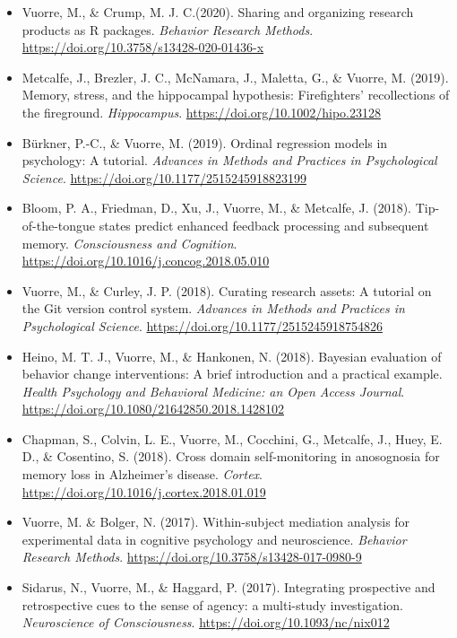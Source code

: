 \documentclass[12pt, a4paper]{article}
\newcommand{\years}[1]{\marginnote{\scriptsize #1}}
\begin{document}
\begin{itemize}
  \item \years{2020} Vuorre, M.\footnotemark[1], \& Crump, M. J. C.\footnotemark[1] (2020). Sharing and organizing research products as R packages. \emph{Behavior Research Methods}. \url{https://doi.org/10.3758/s13428-020-01436-x}
  \item \years{2019} Metcalfe, J., Brezler, J. C., McNamara, J., Maletta, G., \& Vuorre, M. (2019). Memory, stress, and the hippocampal hypothesis: Firefighters' recollections of the fireground. \emph{Hippocampus}. \url{https://doi.org/10.1002/hipo.23128}
  \item Bürkner, P.-C., \& Vuorre, M. (2019). Ordinal regression models in psychology: A tutorial. \emph{Advances in Methods and Practices in Psychological Science}. \url{https://doi.org/10.1177/2515245918823199}
  \item \years{2018} Bloom, P. A., Friedman, D., Xu, J., Vuorre, M., \& Metcalfe, J. (2018). Tip-of-the-tongue states predict enhanced feedback processing and subsequent memory. \emph{Consciousness and Cognition}. \url{https://doi.org/10.1016/j.concog.2018.05.010}
  \item Vuorre, M., \& Curley, J. P. (2018). Curating research assets: A tutorial on the Git version control system. \emph{Advances in Methods and Practices in Psychological Science}. \url{https://doi.org/10.1177/2515245918754826}
  \item Heino, M. T. J.\footnotemark[1], Vuorre, M.\footnotemark[1], \& Hankonen, N. (2018). Bayesian evaluation of behavior change interventions: A brief introduction and a practical example. \emph{Health Psychology and Behavioral Medicine: an Open Access Journal}. \url{https://doi.org/10.1080/21642850.2018.1428102}
  \item Chapman, S., Colvin, L. E., Vuorre, M., Cocchini, G., Metcalfe, J., Huey, E. D., \& Cosentino, S. (2018). Cross domain self-monitoring in anosognosia for memory loss in Alzheimer's disease. \emph{Cortex}. \url{https://doi.org/10.1016/j.cortex.2018.01.019}
  \item \years{2017} Vuorre, M. \& Bolger, N. (2017). Within-subject mediation analysis for experimental data in cognitive psychology and neuroscience. \emph{Behavior Research Methods}. \url{https://doi.org/10.3758/s13428-017-0980-9}
  \item Sidarus, N., Vuorre, M., \& Haggard, P. (2017). Integrating prospective and retrospective cues to the sense of agency: a multi-study investigation. \emph{Neuroscience of Consciousness}. \url{https://doi.org/10.1093/nc/nix012}

\end{itemize}
\end{document}
